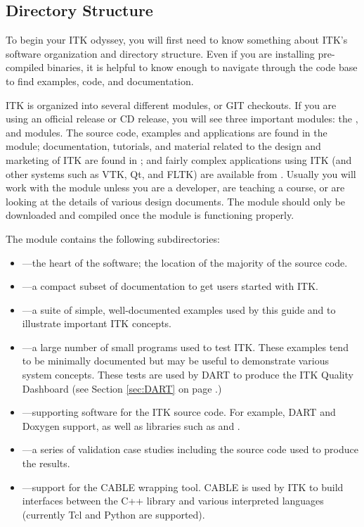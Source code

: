\subsection{Directory Structure}
\label{sec:DirectoryStructure}

To begin your ITK odyssey, you will first need to know something about ITK's
software organization and directory structure. Even if you are installing
pre-compiled binaries, it is helpful to know enough to navigate through the
code base to find examples, code, and documentation.

ITK is organized into several different modules, or GIT checkouts. If you are
using an official release or CD release, you will see three important modules:
the ,  and 
modules. The source code, examples and applications are found in the
 module; documentation, tutorials, and material related to the
design and marketing of ITK are found in ; and fairly
complex applications using ITK (and other systems such as VTK, Qt, and FLTK)
are available from . Usually you will work with the
 module unless you are a developer, are teaching a course, or
are looking at the details of various design documents. The
 module should only be downloaded and
compiled once
the  module is functioning properly.

The  module contains the following subdirectories:
\begin{itemize}
        \item {}---the heart of the software; the location
        of the majority of the source code.
        \item {}---a compact subset of documentation
        to get users started with ITK.
        \item {}---a suite of simple, well-documented
        examples used by this guide and to illustrate important
        ITK concepts.
        \item {}---a large number of small programs used
        to test ITK. These examples tend to be minimally documented but may
        be useful to demonstrate various system concepts. These tests are 
        used by DART to produce the ITK Quality Dashboard 
        (see Section \ref{sec:DART} on 
        page \pageref{sec:DART}.)
        \item {}---supporting software for the ITK
        source code. For example, DART and Doxygen support, as well as 
        libraries such as  and .
        \item {}---a series of validation case studies
        including the source code used to produce the results.
        \item {}---support for the CABLE wrapping tool.
        CABLE is used by ITK to build interfaces between the C++ library and
        various interpreted languages (currently Tcl and Python are supported).
\end{itemize}

